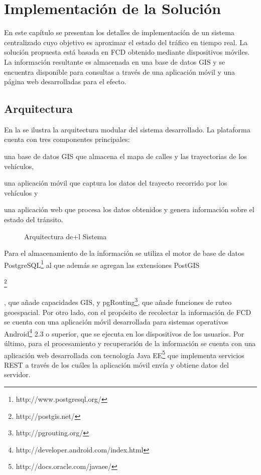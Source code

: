 \chapter{Implementación de la Solución}
\label{cap:6}

En este capítulo se presentan los detalles de implementación de un sistema centralizado cuyo objetivo es aproximar el estado del tráfico en tiempo real. La solución propuesta está basada en FCD obtenido mediante dispositivos móviles. La información resultante es almacenada en una base de datos GIS y se encuentra disponible para consultas a través de una aplicación móvil y una página web desarrolladas para el efecto.

\section{Arquitectura}

En la  se ilustra la arquitectura modular del sistema desarrollado. La plataforma cuenta con tres componentes principales:
\begin{enumerate*}[1)] \item una base de datos GIS que almacena el mapa de calles y las trayectorias de los vehículos, \item una aplicación móvil que captura los datos del trayecto recorrido por los vehículos y \item una aplicación web que procesa los datos obtenidos y genera información sobre el estado del tránsito.
\end{enumerate*}

\begin{figure}[h]
	\centering
	
	\caption{\label{fig:arquitectura} Arquitectura de+l Sistema}	
\end{figure}

Para el almacenamiento de la información se utiliza el motor de base de datos PostgreSQL\footnote{http://www.postgresql.org/} al que además se agregan las extensiones PostGIS\begin{flushright}
	\footnote{http://postgis.net/}
\end{flushright}, que añade capacidades GIS, y pgRouting\footnote{http://pgrouting.org/}, que añade funciones de ruteo geoespacial. Por otro lado, con el propósito de recolectar la información de FCD se cuenta con una aplicación móvil desarrollada para sistemas operativos Android\footnote{http://developer.android.com/index.html} 2.3 o superior, que se ejecuta en los dispositivos de los usuarios. Por último, para el procesamiento y recuperación de la información se cuenta con una aplicación web desarrollada con tecnología Java EE\footnote{http://docs.oracle.com/javaee/} que implementa servicios REST a través de los cuáles la aplicación móvil envía y obtiene datos del servidor.

